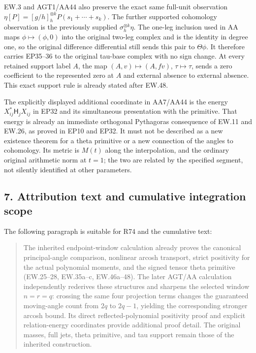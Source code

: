 EW.3 and AGT1/AA44 also preserve the exact same full-unit observation \(\eta[P]=[g/h]_h^{\otimes k}P(s_1+\cdots+s_k)\). The further supported cohomology observation is the previously supplied \(\sigma_h^{\otimes k}\eta\). The one-leg inclusion used in AA maps \(\phi\mapsto(\phi,0)\) into the original two-leg complex and is the identity in degree one, so the original difference differential still sends this pair to \(\Theta\phi\). It therefore carries EP35--36 to the original tau-base complex with no sign change. At every retained support label \(A\), the map \((A,v)\mapsto(A,fv)\), \(\tau\mapsto\tau\), sends a zero coefficient to the represented zero at \(A\) and external absence to external absence. This exact support rule is already stated after EW.48.

The explicitly displayed additional coordinate in AA7/AA44 is the energy \(X_{ij}^*\mathsf H_jX_{ij}\) in EP32 and its simultaneous presentation with the primitive. That energy is already an immediate orthogonal Pythagoras consequence of EW.11 and EW.26, as proved in EP10 and EP32. It must not be described as a new existence theorem for a theta primitive or a new connection of the angles to cohomology. Its metric is \(M(t)\) along the interpolation, and the ordinary original arithmetic norm at \(t=1\); the two are related by the specified segment, not silently identified at other parameters.

\subsection{7. Attribution text and cumulative integration scope}\label{attribution-text-and-cumulative-integration-scope}

The following paragraph is suitable for R74 and the cumulative text:

\begin{quote}
The inherited endpoint-window calculation already proves the canonical principal-angle comparison, nonlinear arcosh transport, strict positivity for the actual polynomial moments, and the signed tensor theta primitive (EW.25--28, EW.35a--c, EW.46a--48). The later AGT/AA calculation independently rederives these structures and sharpens the selected window \(n=r=q\): crossing the same four projection terms changes the guaranteed moving-angle count from \(2q\) to \(2q-1\), yielding the corresponding stronger arcosh bound. Its direct reflected-polynomial positivity proof and explicit relation-energy coordinates provide additional proof detail. The original masses, full jets, theta primitive, and tau support remain those of the inherited construction.
\end{quote}

